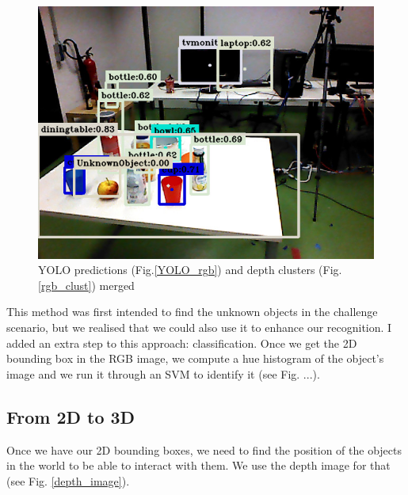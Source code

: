 \documentclass[a4paper, twocolumn]{article}
\begin{document}
    \begin{figure}
        \includegraphics[width=\columnwidth]{../img/summary_recognition.jpg}
        \caption{YOLO predictions (Fig.\ref{YOLO_rgb}) and depth clusters (Fig.\ref{rgb_clust}) merged}
        \label{recognition_rgb}
    \end{figure}

    This method was first intended to find the unknown objects in the challenge scenario, but we realised that we could also use it to enhance our recognition. I added an extra step to this approach: classification. Once we get the 2D bounding box in the RGB image, we compute a hue histogram of the object's image and we run it through an SVM to identify it (see Fig. ...).

    \subsection{From 2D to 3D}

    Once we have our 2D bounding boxes, we need to find the position of the objects in the world to be able to interact with them. We use the depth image for that (see Fig. \ref{depth_image}).
\end{document}
